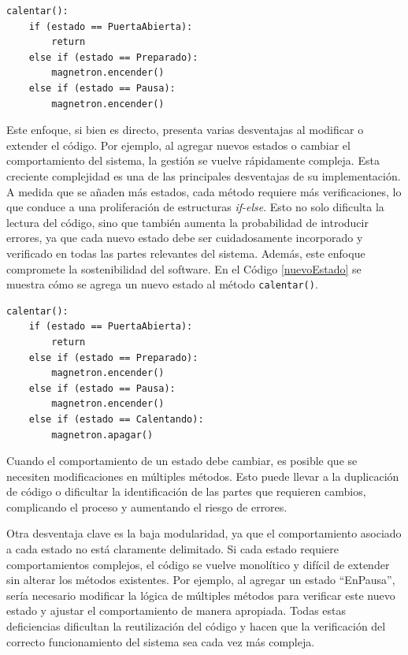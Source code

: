 \begin{lstlisting}[label=codigoMicro,caption={Ejemplo de manejo de estados tradicional, en el caso del microondas.}]
calentar():
    if (estado == PuertaAbierta):
        return
    else if (estado == Preparado):
        magnetron.encender()
    else if (estado == Pausa):
    	magnetron.encender()

\end{lstlisting}

Este enfoque, si bien es directo, presenta varias desventajas al modificar o extender el código. Por ejemplo, al agregar nuevos estados o cambiar el comportamiento del sistema, la gestión se vuelve rápidamente compleja. Esta creciente complejidad es una de las principales desventajas de su implementación. A medida que se añaden más estados, cada método requiere más verificaciones, lo que conduce a una proliferación de estructuras \textit{if-else}. Esto no solo dificulta la lectura del código, sino que también aumenta la probabilidad de introducir errores, ya que cada nuevo estado debe ser cuidadosamente incorporado y verificado en todas las partes relevantes del sistema. Además, este enfoque compromete la sostenibilidad del software. En el Código \ref{nuevoEstado} se muestra cómo se agrega un nuevo estado al método \verb|calentar()|.

\begin{lstlisting}[label=nuevoEstado,caption={Ejemplo de introducción de un nuevo estado a la solución tradicional.}]
calentar():
    if (estado == PuertaAbierta):
        return
    else if (estado == Preparado):
        magnetron.encender()
    else if (estado == Pausa):
    	magnetron.encender()
    else if (estado == Calentando):
    	magnetron.apagar()

\end{lstlisting}

Cuando el comportamiento de un estado debe cambiar, es posible que se necesiten modificaciones en múltiples métodos. Esto puede llevar a la duplicación de código o dificultar la identificación de las partes que requieren cambios, complicando el proceso y aumentando el riesgo de errores. 

Otra desventaja clave es la baja modularidad, ya que el comportamiento asociado a cada estado no está claramente delimitado. Si cada estado requiere comportamientos complejos, el código se vuelve monolítico y difícil de extender sin alterar los métodos existentes. Por ejemplo, al agregar un estado ``EnPausa'', sería necesario modificar la lógica de múltiples métodos para verificar este nuevo estado y ajustar el comportamiento de manera apropiada. Todas estas deficiencias dificultan la reutilización del código y hacen que la verificación del correcto funcionamiento del sistema sea cada vez más compleja.

